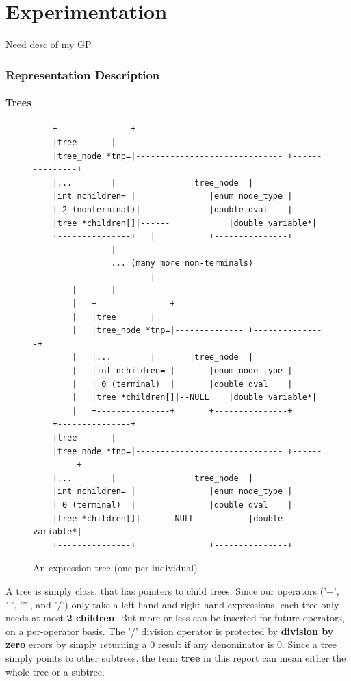 \documentclass[12pt]{article}
\begin{document}
\part{Experimentation}
Need desc of my GP

\section{Representation Description}
\subsection{Trees}
\label{sec:trees}
\begin{figure}[!h]
        \begin{center}
		\scriptsize
		\begin{lstlisting}
	+---------------+
	|tree		|
	|tree_node *tnp=|------------------------------ +---------------+
	|...		|				|tree_node	|
	|int nchildren= |				|enum node_type	|
	| 2 (nonterminal)|				|double dval	|
	|tree *children[]|------			|double variable*|
	+---------------+	|			+---------------+
				|
				... (many more non-terminals)
		----------------|
		|		|
		|	+---------------+
		|	|tree		|
		|	|tree_node *tnp=|-------------- +---------------+
		|	|...		|		|tree_node	|
		|	|int nchildren= |		|enum node_type	|
		|	| 0 (terminal)	|		|double dval	|
		|	|tree *children[]|--NULL	|double variable*|
		|	+---------------+		+---------------+
	+---------------+
	|tree		|
	|tree_node *tnp=|------------------------------ +---------------+
	|...		|				|tree_node	|
	|int nchildren= |				|enum node_type	|
	| 0 (terminal)	|				|double dval	|
	|tree *children[]|-------NULL			|double variable*|
	+---------------+				+---------------+
		\end{lstlisting}
		\normalsize
               \caption{An expression tree (one per individual)}
                \label{tree_rep}
        \end{center}
\end{figure}

A tree is simply class, that has pointers to child trees. Since our operators ('+', '-', '*', and '/') only take a left hand and right hand expressions, each tree only needs at most \textbf{2 children}. But more or less can be inserted for future operators, on a per-operator basis. The '/' division operator is protected by \textbf{division by zero} errors by simply returning a 0 result if any denominator is 0. Since a tree simply points to other subtrees, the term \textbf{tree} in this report can mean either the whole tree or a subtree.
\end{document}
